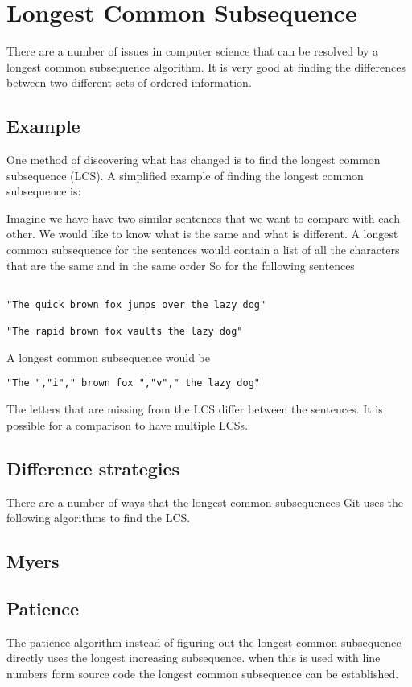 \section{Longest Common Subsequence}
There are a number of issues in computer science that can be resolved by a longest common subsequence algorithm.
It is very good at finding the differences between two different sets of ordered information.


\subsection{Example}
One method of discovering what has changed is to find the longest common subsequence (LCS).
A simplified example of finding the longest common subsequence is:

Imagine we have have two similar sentences that we want to compare with each other.  
We would like to know what is the same and what is different.
A longest common subsequence for the sentences would contain a list of all the characters that are the same and in the same order
So for the following sentences

\begin{verbatim}

"The quick brown fox jumps over the lazy dog"

"The rapid brown fox vaults the lazy dog"

\end{verbatim}
A longest common subsequence would be
\begin{verbatim}
"The ","i"," brown fox ","v"," the lazy dog"
\end{verbatim}
The letters that are missing from the LCS differ between the sentences.
It is possible for a comparison to have multiple LCSs.

\subsection{Difference strategies}
There are a number of ways that the longest common subsequences
Git uses the following algorithms to find the LCS.

\subsection{Myers}


\subsection{Patience}
The patience algorithm instead of figuring out the longest common subsequence directly uses the longest increasing subsequence.
when this is used with line numbers form source code the longest common subsequence can be established.

